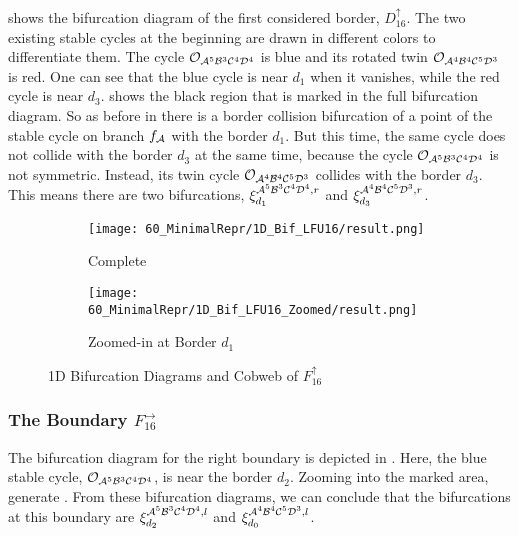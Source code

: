  shows the bifurcation diagram of the first considered border, $D_{16}^\uparrow$.
The two existing stable cycles at the beginning are drawn in different colors to differentiate them.
The cycle $\mathcal{O}_{\mathcal{A}^5\mathcal{B}^3\mathcal{C}^4\mathcal{D}^4}$ is blue and its rotated twin $\mathcal{O}_{\mathcal{A}^4\mathcal{B}^4\mathcal{C}^5\mathcal{D}^3}$ is red.
One can see that the blue cycle is near $d_1$ when it vanishes, while the red cycle is near $d_3$.
 shows the black region that is marked in the full bifurcation diagram.
So as before in  there is a border collision bifurcation of a point of the stable cycle on branch $f_{\mathcal{A}}$ with the border $d_1$.
But this time, the same cycle does not collide with the border $d_3$ at the same time, because the cycle $\mathcal{O}_{\mathcal{A}^5\mathcal{B}^3\mathcal{C}^4\mathcal{D}^4}$ is not symmetric.
Instead, its twin cycle $\mathcal{O}_{\mathcal{A}^4\mathcal{B}^4\mathcal{C}^5\mathcal{D}^3}$ collides with the border $d_3$.
This means there are two bifurcations, $\xi_{d_1}^{\mathcal{A}^5\mathcal{B}^3\mathcal{C}^4\mathcal{D}^4, r}$ and $\xi_{d_3}^{\mathcal{A}^4\mathcal{B}^4\mathcal{C}^5\mathcal{D}^3, r}$.

\begin{figure}
    \centering
    \begin{subfigure}{0.4\textwidth}
        \centering
        \texttt{[image: 60\_MinimalRepr/1D\_Bif\_LFU16/result.png]}
        \caption{Complete}
        \label{fig:final.bifurcation.F.up}
    \end{subfigure}
    \begin{subfigure}{0.4\textwidth}
        \centering
        \texttt{[image: 60\_MinimalRepr/1D\_Bif\_LFU16\_Zoomed/result.png]}
        \caption{Zoomed-in at Border $d_1$}
        \label{fig:final.bifurcation.F.up.zoomed}
    \end{subfigure}
    \caption{1D Bifurcation Diagrams and Cobweb of $F_{16}^\uparrow$}
\end{figure}

\subsubsection{The Boundary $F_{16}^\rightarrow$}

The bifurcation diagram for the right boundary is depicted in .
Here, the blue stable cycle, $\mathcal{O}_{\mathcal{A}^5\mathcal{B}^3\mathcal{C}^4\mathcal{D}^4}$, is near the border $d_2$.
Zooming into the marked area, generate .
From these bifurcation diagrams, we can conclude that the bifurcations at this boundary are $\xi_{d_2}^{\mathcal{A}^5\mathcal{B}^3\mathcal{C}^4\mathcal{D}^4, l}$ and $\xi_{d_0}^{\mathcal{A}^4\mathcal{B}^4\mathcal{C}^5\mathcal{D}^3, l}$.

